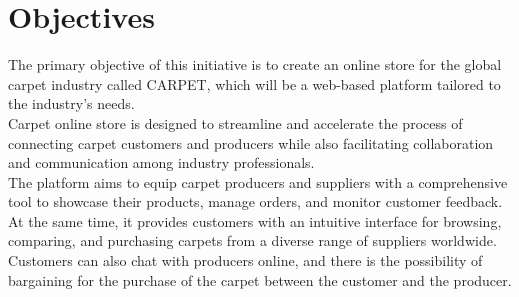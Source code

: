 \section{Objectives}

The primary objective of this initiative is to create an online store for the global carpet industry called CARPET, which will be a web-based platform tailored to the industry's needs. \\
Carpet online store is designed to streamline and accelerate the process of connecting carpet customers and producers while also facilitating collaboration and communication among industry professionals. \\
The platform aims to equip carpet producers and suppliers with a comprehensive tool to showcase their products, manage orders, and monitor customer feedback. \\
At the same time, it provides customers with an intuitive interface for browsing, comparing, and purchasing carpets from a diverse range of suppliers worldwide. \\
Customers can also chat with producers online, and there is the possibility of bargaining for the purchase of the carpet between the customer and the producer.
